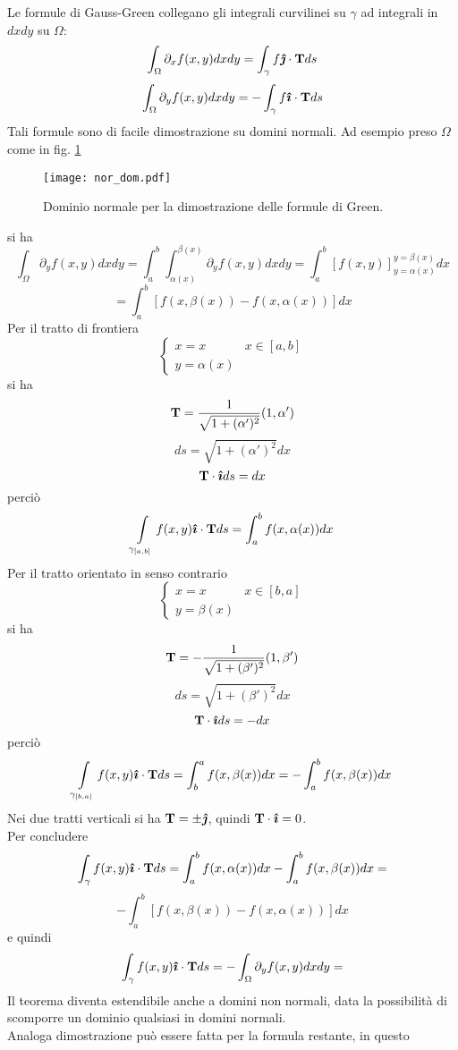 Le formule di Gauss-Green collegano gli integrali curvilinei su $\gamma$
ad integrali in $dx dy$ su $\Omega$:
\[
	\int_{\Omega}\partial_x f(x,y)dx dy= \int_{\gamma} f \boldsymbol{\hat{\jmath}} \cdot {\bf T}
ds
\]
\[
	\int_{\Omega}\partial_y f(x,y)dx dy= - \int_{\gamma} f \boldsymbol{\hat{\imath}} \cdot {\bf
T} ds
\]
Tali formule sono di facile dimostrazione su domini normali. Ad esempio
preso $\Omega$ come in fig. \ref{nor_dom}
\begin{figure}[H]
	\centering
	\texttt{[image: nor\_dom.pdf]}
	\caption{Dominio normale per la dimostrazione delle formule di Green.}
	\label{nor_dom}
\end{figure}
\noindent
si ha
\[
	\int_{\Omega} \partial_y f (x,y) dx dy=
	\int_a^b \int_{\alpha(x)}^{\beta(x)}
	\partial_y f (x,y) dx dy=
	\int_a^b \left[
		f(x,y)
	\right]_{y=\alpha(x)}^{y=\beta(x)}dx
\]
\[
	= \int_a^b \left[
	f(x,\beta (x)) - f(x, \alpha(x))
	\right] dx
\]
Per il tratto di frontiera
\[
	\left\{
	\begin{array}{ll}
		x=x & x \in [a,b] \\
		y= \alpha(x)
	\end{array}
	\right.
\]
si ha
\[
	{\bf T}= \frac{1}{\sqrt{1+ (\alpha ' )^2}}(1,\alpha ')
\]
\[
	ds= \sqrt{1+ (\alpha ' )^2} dx
\]
\[
	{\bf T} \cdot \boldsymbol{\hat{\imath}} ds= dx
\]
perci\`o
\[
	\int \limits_{\gamma_{[a,b]}} f(x,y)\boldsymbol{\hat{\imath}} \cdot {\bf T} ds
	= \int_a^b f(x, \alpha(x)) dx
\]
Per il tratto orientato in senso contrario
\[
	\left\{
	\begin{array}{ll}
		x=x & x \in [b,a] \\
		y= \beta(x)
	\end{array}
	\right.
\]
si ha
\[
	{\bf T}= - \frac{1}{\sqrt{1+ (\beta ' )^2}}(1,\beta ')
\]
\[
	ds= \sqrt{1+ (\beta ' )^2} dx
\]
\[
	{\bf T} \cdot \boldsymbol{\hat{\imath}} ds= -dx
\]
perci\`o
\[
	\int \limits_{\gamma_{[b,a]}} f(x,y)\boldsymbol{\hat{\imath}} \cdot {\bf T} ds
	= \int_b^a f(x, \beta(x)) dx
	= -\int_a^b f(x, \beta(x)) dx
\]
Nei due tratti verticali si ha ${\bf T} = \pm \boldsymbol{\hat{\jmath}}$,
quindi ${\bf T} \cdot \boldsymbol{\hat{\imath}} = 0$.\\
Per concludere
\[
	\int_{\gamma} f(x,y)\boldsymbol{\hat{\imath}} \cdot {\bf T} ds =
	\int_a^b f(x, \alpha(x)) dx
	- \int_a^b f(x, \beta(x)) dx=
\]
\[
	- \int_a^b \left[ f(x, \beta(x)) -f(x, \alpha(x)) \right] dx
\]
e quindi
\[
	\int_{\gamma} f(x,y)\boldsymbol{\hat{\imath}} \cdot {\bf T} ds =
	- \int_{\Omega} \partial_y f (x,y) dx dy=
\]
Il teorema diventa estendibile anche a domini non normali, data la possibilit\`a
di scomporre un dominio qualsiasi in domini normali.\\
Analoga dimostrazione pu\`o essere fatta per la formula restante, in questo
